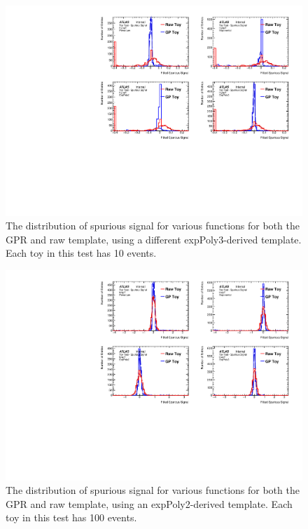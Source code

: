 \begin{figure} 
\begin{center}
  \includegraphics[width=\textwidth]{figures/background/gpr/validation/nominal/ToyTest_FitSigVals_highpT_10_noSig}   
\caption{The distribution of spurious signal for various functions for both the GPR and raw template, using a different expPoly3-derived template. Each toy in this test has 10 events.}
\label{fig:highpt_10_noSig}
\end{center}
\end{figure}

\begin{figure} 
\begin{center}
  \includegraphics[width=\textwidth]{figures/background/gpr/validation/nominal/ToyTest_FitSigVals_lowpT_100_noSig}   
\caption{The distribution of spurious signal for various functions for both the GPR and raw template, using an expPoly2-derived template. Each toy in this test has 100 events.}
\label{fig:lowpt_100_noSig}
\end{center}
\end{figure}

